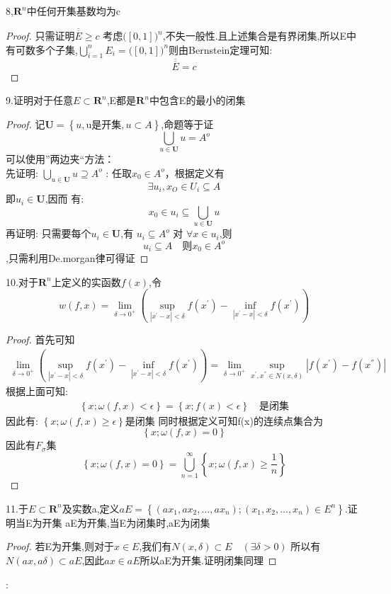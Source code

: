 8,\(\mathbf{R}^n\)中任何开集基数均为c 
\begin{proof}
    只需证明\(\overline{\overline{E}}\geq c\) 考虑\(\bigl([0,1]\bigr)^n\),不失一般性.且上述集合是有界闭集,所以E中有可数多个子集,\(\bigcup\limits_{i=1}^n E_i = \bigl([0,1]\bigr)^n\)则由Bernstein定理可知: \[\overline{\overline{E}} = c \]
\end{proof}
9.证明对于任意\(E \subset \mathbf{R}^n\),E都是\(\mathbf{R}^n\)中包含E的最小的闭集
\begin{proof}
    记\(\mathbf{U}=\left\{u,\text{u是开集},u\subset A\right\}\),命题等于证 \[\bigcup_{u \in \mathbf{U}}u=A^{o}\]
    可以使用”两边夹“方法： \\
    先证明: \(\bigcup_{u \in \mathbf{U}}u \supseteq A^{o}\) : 任取\(x_0 \in A^{o}\)，根据定义有 \[\exists u_i , x_O \in U_i \subseteq A \]
    即\(u_i \in \mathbf{U}\),因而 有:\[x_0 \in u_i \subseteq \bigcup_{u \in \mathbf{U}}u\]
    再证明: 只需要每个\(u_i \in \mathbf{U}\),有 \(u_i \subseteq A^{o}\) 对 \(\forall x \in u_i\),则
    \[u_i \subseteq A \quad \text{则} x_0 \in A ^{o}\],只需利用De.morgan律可得证
\end{proof}
10.对于\(\mathbf{R}^n\)上定义的实函数\(f(x)\),令
\[w(f,x)= \lim_{\delta \rightarrow 0^{+}}(\sup\limits_{|x^{'}- x | < \delta } f(x^{'})- \inf\limits_{|x^{'}- x | < \delta } f(x^{'}))\]
\begin{proof}
    首先可知
    \begin{align*}
        \lim_{\delta \rightarrow 0^{+}}(\sup\limits_{|x^{'}- x | < \delta } f(x^{'})- \inf\limits_{|x^{'}- x | < \delta } f(x^{'})) 
        = \lim_{\delta \rightarrow 0^{+}}{\sup\limits_{x^{'}, x^{''} \in N (x ,\delta)} |f(x^{'})-f(x^{''})|}
    \end{align*}
    根据上面可知: 
    \begin{align*}
        \left\{x ; \omega(f,x) < \epsilon \right\} = \left\{x ;f(x) < \epsilon \right\} \quad \text{是闭集}
    \end{align*}
    因此有:
    \(\left\{x; \omega(f,x) \geq \epsilon \right\}\)是闭集 同时根据定义可知f(x)的连续点集合为\[\left\{x; \omega(f,x) = 0 \right\}\]
    因此有\(F_{\sigma}\)集 
    \[\left\{x; \omega(f,x) = 0 \right\} = \bigcup\limits_{n=1}^{\infty} \left\{x ; \omega(f,x) \geq \frac{1}{n}\right\}\]
\end{proof}
11.于\(E \subset \mathbf{R}^n\)及实数a,定义\(aE=\left\{(ax_1, ax_2 ,\dots ,ax_n) ; (x_1,x_2,\dots , x_n) \in E^n \right\}\).证明当E为开集 aE为开集,当E为闭集时,aE为闭集
\begin{proof}
    若E为开集,则对于\(x\in E\),我们有\(N(x,\delta) \subset E \quad (\exists \delta > 0)\)
    所以有\(N(ax, a\delta) \subset aE\),因此\(ax \in aE\)所以aE为开集.证明闭集同理
\end{proof}:
